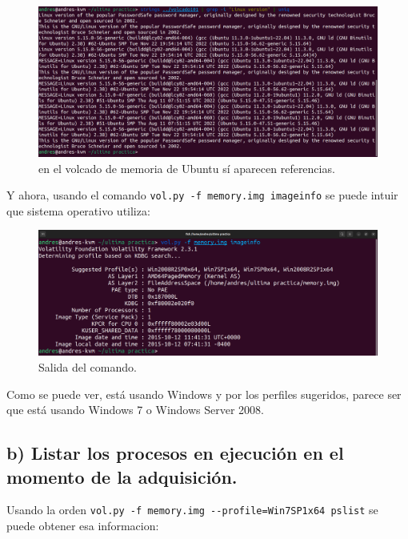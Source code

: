 \documentclass{article}
\begin{document}
\begin{figure}[H]
    \centering
    \includegraphics[width=\textwidth]{imagenes/Captura desde 2022-12-06 12-56-51-linux.png}
    \caption{en el volcado de memoria de Ubuntu sí aparecen referencias.}
\end{figure}


Y ahora, usando el comando \verb|vol.py -f memory.img imageinfo| se puede intuir que sistema operativo utiliza:

\begin{figure}[H]
    \centering
    \includegraphics[width=\textwidth]{imagenes/Captura desde 2022-12-06 12-36-39.png}
    \caption{Salida del comando.}
\end{figure}

Como se puede ver, está usando Windows y por los perfiles sugeridos, parece ser que está usando Windows 7 o Windows Server 2008.

\subsection{b) Listar los procesos en ejecución en el momento de la adquisición.}

Usando la orden \verb|vol.py -f memory.img --profile=Win7SP1x64 pslist| se puede obtener esa informacion:
\end{document}

